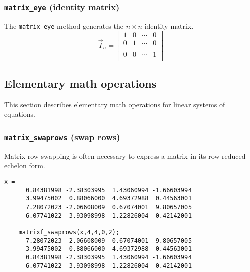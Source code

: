 \subsubsection{{\tt matrix\_eye} (identity matrix)}
\label{module:matrix:eye}
The {\tt matrix\_eye} method generates the $n \times n$ identity matrix.
\[
    \vec{I}_n = 
    \begin{bmatrix}
        1 & 0 & \cdots & 0 \\
        0 & 1 & \cdots & 0 \\
        \\
        0 & 0 & \cdots & 1 \\
    \end{bmatrix}
\]

% 
%
\subsection{Elementary math operations}
\label{module:matrix:elementary}
This section describes elementary math operations for linear systems of
equations.

\subsubsection{{\tt matrix\_swaprows} (swap rows)}
\label{module:matrix:swaprows}
Matrix row-swapping is often necessary to express a matrix in its row-reduced
echelon form.
\begin{Verbatim}[fontsize=\small]
    x = 
      0.84381998 -2.38303995  1.43060994 -1.66603994
      3.99475002  0.88066000  4.69372988  0.44563001
      7.28072023 -2.06608009  0.67074001  9.80657005
      6.07741022 -3.93098998  1.22826004 -0.42142001

    matrixf_swaprows(x,4,4,0,2);
      7.28072023 -2.06608009  0.67074001  9.80657005
      3.99475002  0.88066000  4.69372988  0.44563001
      0.84381998 -2.38303995  1.43060994 -1.66603994
      6.07741022 -3.93098998  1.22826004 -0.42142001
\end{Verbatim}

